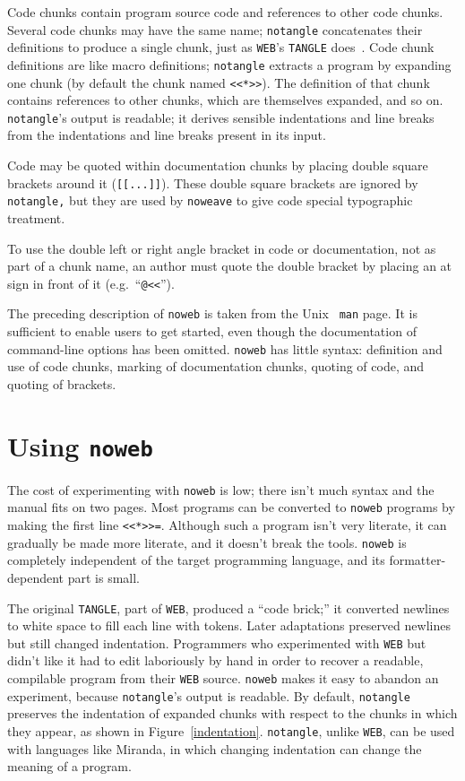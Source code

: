 Code chunks contain program source code and references to other code
chunks.  
Several code chunks may have the same name; {\tt notangle}
concatenates their definitions to produce a single chunk, just as
{\tt WEB}'s {\tt TANGLE} does~\cite{knuth:web}.
Code chunk definitions are like macro definitions;
{\tt notangle} extracts a program by expanding one chunk (by default
the chunk named \verb+<<*>>+).
The definition of that chunk contains references to other chunks,
which are themselves expanded, and so on.
{\tt notangle}'s output is readable; it derives
sensible indentations and line breaks from the indentations and line
breaks present in its input.

Code may be quoted within documentation chunks by placing double
square brackets around it ({\tt [[...]]}). 
These double square brackets are ignored by {\tt notangle,} but they
are used by {\tt noweave} to give code special typographic
treatment.

To use the double left or right angle %
bracket in code or documentation,
not as part of a chunk name, an author must quote the double 
bracket by placing an at sign in front of it (e.g.~``{\tt @<<}'').

\medskip

The preceding description of {\tt noweb} is taken from the Unix {\tt
man} page. 
It is sufficient to enable users to get started, even though 
the documentation of command-line options has been omitted. 
{\tt noweb} has little syntax: definition and use of code chunks, marking of
documentation chunks, quoting of code, and quoting of brackets.



\section{Using {\tt noweb}}%

The cost of experimenting with \verb+noweb+ is low; there isn't much
syntax and the manual fits on two pages.
Most programs can be converted to \verb+noweb+ programs by making the
first line \verb+<<*>>=+.
Although such a program isn't very literate, it can gradually be made
more literate, and it doesn't break the tools.
\verb+noweb+ is completely independent of the target programming
language, and
its formatter-dependent part is small.

The original {\tt TANGLE}, part of {\tt WEB}, produced a ``code
brick;'' it converted newlines to white space to fill each line with
tokens.
Later adaptations preserved newlines but still changed indentation.
Programmers who experimented with {\tt WEB} but didn't like it had to
edit laboriously by hand in order to recover a readable, compilable
program from their {\tt WEB} source.
\verb+noweb+ makes it easy to abandon an experiment, because 
\verb+notangle+'s output is readable.
By default, \verb+notangle+ preserves the indentation of expanded
chunks with respect to the chunks in which they appear, as shown in
Figure~\ref{indentation}. 
\verb+notangle+, unlike {\tt WEB}, can be used with languages like
Miranda, in which changing indentation can change the meaning of a
program.

